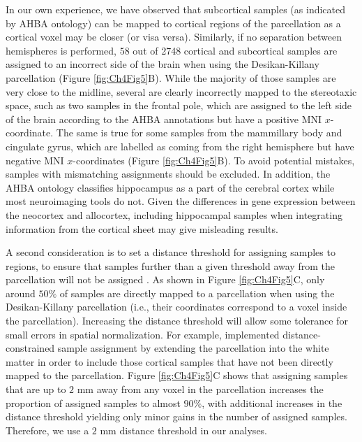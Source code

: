 \documentclass[10pt,A4]{article}
\begin{document}
In our own experience, we have observed that subcortical samples (as indicated by AHBA ontology) can be mapped to cortical regions of the parcellation as a cortical voxel may be closer (or visa versa). Similarly, if no separation between hemispheres is performed, $58$ out of \num{2748} cortical and subcortical samples are assigned to an incorrect side of the brain when using the Desikan-Killany \citep{Desikan2006} parcellation (Figure \ref{fig:Ch4Fig5}B). While the majority of those samples are very close to the midline, several are clearly incorrectly mapped to the stereotaxic space, such as two samples in the frontal pole, which are assigned to the left side of the brain according to the AHBA annotations but have a positive MNI $x$-coordinate. The same is true for some samples from the mammillary body and cingulate gyrus, which are labelled as coming from the right hemisphere but have negative MNI $x$-coordinates (Figure \ref{fig:Ch4Fig5}B). To avoid potential mistakes, samples with mismatching assignments should be excluded. In addition, the AHBA ontology classifies hippocampus as a part of the cerebral cortex while most neuroimaging tools do not. Given the differences in gene expression between the neocortex and allocortex, including hippocampal samples when integrating information from the cortical sheet may give misleading results.

A second consideration is to set a distance threshold for assigning samples to regions, to ensure that samples further than a given threshold away from the parcellation will not be assigned \citep{Romero-Garcia2018}. As shown in Figure \ref{fig:Ch4Fig5}C, only around $50\%$ of samples are directly mapped to a parcellation when using the Desikan-Killany \citep{Desikan2006} parcellation (i.e., their coordinates correspond to a voxel inside the parcellation). Increasing the distance threshold will allow some tolerance for small errors in spatial normalization. For example, \citet{Romero-Garcia2018} implemented distance-constrained sample assignment by extending the parcellation into the white matter in order to include those cortical samples that have not been directly mapped to the parcellation. Figure \ref{fig:Ch4Fig5}C shows that assigning samples that are up to $2$ mm away from any voxel in the parcellation increases the proportion of assigned samples to almost $90\%$, with additional increases in the distance threshold yielding only minor gains in the number of assigned samples. Therefore, we use a $2$ mm distance threshold in our analyses.
\end{document}
